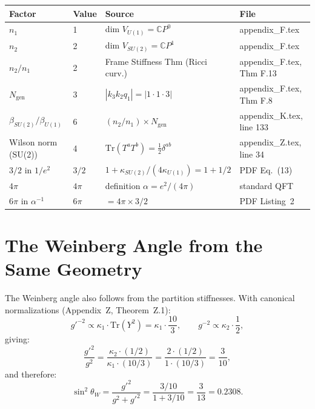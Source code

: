 \documentclass[11pt]{article}
\begin{document}
\begin{center}
\renewcommand{\arraystretch}{1.3}
\begin{tabular}{llll}
\toprule
\textbf{Factor} & \textbf{Value} & \textbf{Source} & \textbf{File} \\
\midrule
$n_1$ & 1 & dim $V_{U(1)} = \mathbb{C}P^0$ & appendix\_F.tex \\
$n_2$ & 2 & dim $V_{SU(2)} = \mathbb{C}P^1$ & appendix\_F.tex \\
$n_2/n_1$ & 2 & Frame Stiffness Thm (Ricci curv.) & appendix\_F.tex, Thm F.13 \\
$N_{\mathrm{gen}}$ & 3 & $|k_3 k_2 q_1| = |1 \cdot 1 \cdot 3|$ & appendix\_F.tex, Thm F.8 \\
$\beta_{SU(2)}/\beta_{U(1)}$ & 6 & $(n_2/n_1) \times N_{\mathrm{gen}}$ & appendix\_K.tex, line 133 \\
Wilson norm (SU(2)) & 4 & $\mathrm{Tr}(T^aT^b) = \frac{1}{2}\delta^{ab}$ & appendix\_Z.tex, line 34 \\
$3/2$ in $1/e^2$ & $3/2$ & $1 + \kappa_{SU(2)}/(4\kappa_{U(1)}) = 1 + 1/2$ & PDF Eq.~(13) \\
$4\pi$ & $4\pi$ & definition $\alpha = e^2/(4\pi)$ & standard QFT \\
$6\pi$ in $\alpha^{-1}$ & $6\pi$ & $= 4\pi \times 3/2$ & PDF Listing~2 \\
\bottomrule
\end{tabular}
\end{center}

\section{The Weinberg Angle from the Same Geometry}

The Weinberg angle also follows from the partition stiffnesses.
With canonical normalizations (Appendix~Z, Theorem~Z.1):
\[
g'^{-2} \propto \kappa_1 \cdot \mathrm{Tr}(Y^2) = \kappa_1 \cdot \frac{10}{3},
\qquad
g^{-2} \propto \kappa_2 \cdot \frac{1}{2},
\]
giving:
\[
\frac{g'^2}{g^2} = \frac{\kappa_2 \cdot (1/2)}{\kappa_1 \cdot (10/3)}
= \frac{2 \cdot (1/2)}{1 \cdot (10/3)} = \frac{3}{10},
\]
and therefore:
\begin{equation}
\sin^2\theta_W = \frac{g'^2}{g^2 + g'^2} = \frac{3/10}{1 + 3/10}
= \frac{3}{13} = 0.2308.
\end{equation}
\end{document}
